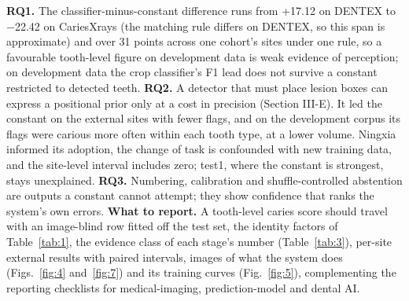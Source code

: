 \documentclass[conference]{IEEEtran}
\begin{document}
\textbf{RQ1.} The classifier-minus-constant difference runs from +17.12 on DENTEX to $-$22.42 on CariesXrays (the matching rule differs on DENTEX, so this span is approximate) and over 31 points across one cohort's sites under one rule, so a favourable tooth-level figure on development data is weak evidence of perception; on development data the crop classifier's F1 lead does not survive a constant restricted to detected teeth. \textbf{RQ2.} A detector that must place lesion boxes can express a positional prior only at a cost in precision (Section III-E). It led the constant on the external sites with fewer flags, and on the development corpus its flags were carious more often within each tooth type, at a lower volume. Ningxia informed its adoption, the change of task is confounded with new training data, and the site-level interval includes zero; test1, where the constant is strongest, stays unexplained. \textbf{RQ3.} Numbering, calibration and shuffle-controlled abstention are outputs a constant cannot attempt; they show confidence that ranks the system's own errors. \textbf{What to report.} A tooth-level caries score should travel with an image-blind row fitted off the test set, the identity factors of Table~\ref{tab:1}, the evidence class of each stage's number (Table~\ref{tab:3}), per-site external results with paired intervals, images of what the system does (Figs.~\ref{fig:4} and~\ref{fig:7}) and its training curves (Fig.~\ref{fig:5}), complementing the reporting checklists for medical-imaging, prediction-model and dental AI.
\end{document}
